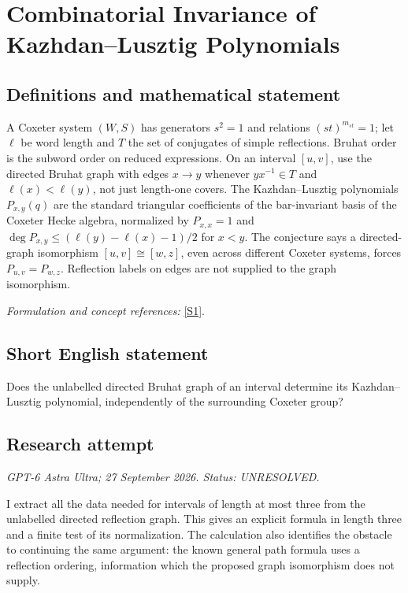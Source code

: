 \documentclass[11pt]{article}
\begin{document}
\section*{\texorpdfstring{Combinatorial Invariance of Kazhdan–Lusztig Polynomials}{Combinatorial Invariance of Kazhdan–Lusztig Polynomials}}\label{statement}
\subsection{Definitions and mathematical statement}
A Coxeter system $(W,S)$ has generators $s^2=1$ and relations $(st)^{m_{st}}=1$; let $\ell$ be word length and $T$ the set of conjugates of simple reflections. Bruhat order is the subword order on reduced expressions. On an interval $[u,v]$, use the directed Bruhat graph with edges $x\to y$ whenever $yx^{-1}\in T$ and $\ell(x)<\ell(y)$, not just length-one covers. The Kazhdan--Lusztig polynomials $P_{x,y}(q)$ are the standard triangular coefficients of the bar-invariant basis of the Coxeter Hecke algebra, normalized by $P_{x,x}=1$ and $\deg P_{x,y}\le(\ell(y)-\ell(x)-1)/2$ for $x<y$. The conjecture says a directed-graph isomorphism $[u,v]\cong[w,z]$, even across different Coxeter systems, forces $P_{u,v}=P_{w,z}$. Reflection labels on edges are not supplied to the graph isomorphism.
\par\smallskip\textit{Formulation and concept references:} \href{https://link.springer.com/article/10.1007/s00029-024-00972-0}{[S1]}.

\subsection{Short English statement}
Does the unlabelled directed Bruhat graph of an interval determine its Kazhdan--Lusztig polynomial, independently of the surrounding Coxeter group?
\subsection{Research attempt}
\textit{GPT-6 Astra Ultra; 27 September 2026. Status: UNRESOLVED.}

I extract all the data needed for intervals of length at most three
from the unlabelled directed reflection graph. This gives an explicit
formula in length three and a finite test of its normalization. The
calculation also identifies the obstacle to continuing the same argument:
the known general path formula uses a reflection ordering, information
which the proposed graph isomorphism does not supply.
\end{document}
